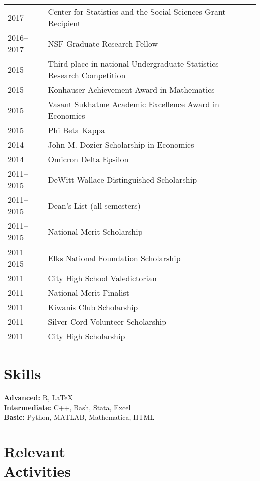 \documentclass[margin,centered]{res}
\begin{document}
\begin{resume}
\begin{tabular}{@{}p{0.8in}p{4in}}
2017 & Center for Statistics and the Social Sciences Grant Recipient\\
2016--2017 & NSF Graduate Research Fellow\\
2015 & Third place in national Undergraduate Statistics Research Competition\\
2015 & Konhauser Achievement Award in Mathematics\\
2015 & Vasant Sukhatme Academic Excellence Award in Economics \\
2015 & Phi Beta Kappa\\
2014 & John M. Dozier Scholarship in Economics \\
2014 & Omicron Delta Epsilon\\
2011--2015 & DeWitt Wallace Distinguished Scholarship \\
2011--2015 & Dean's List (all semesters)\\
2011--2015 & National Merit Scholarship \\
2011--2015 & Elks National Foundation Scholarship\\
2011 & City High School Valedictorian\\
2011 & National Merit Finalist\\
2011 & Kiwanis Club Scholarship \\
2011 & Silver Cord Volunteer Scholarship\\
2011 & City High Scholarship\\
\end{tabular}





\section{\sc Skills}
{\bf Advanced:} R, LaTeX\\
{\bf Intermediate:} C++, Bash, Stata, Excel\\
{\bf Basic:} Python, MATLAB, Mathematica, HTML


\section{\sc Relevant \\ Activities}



\end{resume}
\end{document}
